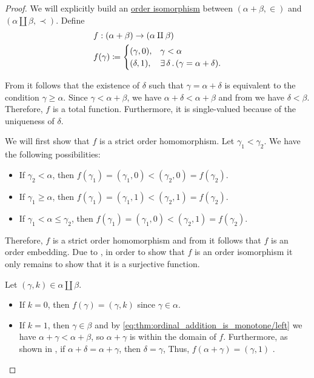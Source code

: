 \begin{proof}
  We will explicitly build an \hyperref[def:preordered_set/homomorphism]{order isomorphism} between \( (\alpha + \beta, \in) \) and \( (\alpha \amalg \beta, \prec) \). Define
  \begin{equation*}
    \begin{aligned}
      &f: (\alpha + \beta) \to (\alpha \amalg \beta) \\
      &f(\gamma) \coloneqq \begin{cases}
        (\gamma, 0), &\gamma < \alpha \\
        (\delta, 1), &\exists \thinspace \delta \thinspace . \thinspace (\gamma = \alpha + \delta).
      \end{cases}
    \end{aligned}
  \end{equation*}

  From  it follows that the existence of \( \delta \) such that \( \gamma = \alpha + \delta \) is equivalent to the condition \( \gamma \geq \alpha \). Since \( \gamma < \alpha + \beta \), we have \( \alpha + \delta < \alpha + \beta \) and from  we have \( \delta < \beta \). Therefore, \( f \) is a total function. Furthermore, it is single-valued because of the uniqueness of \( \delta \).

  We will first show that \( f \) is a strict order homomorphism. Let \( \gamma_1 < \gamma_2 \). We have the following possibilities:
  \begin{itemize}
    \item If \( \gamma_2 < \alpha \), then \( f(\gamma_1) = (\gamma_1, 0) < (\gamma_2, 0) = f(\gamma_2) \).
    \item If \( \gamma_1 \geq \alpha \), then \( f(\gamma_1) = (\gamma_1, 1) < (\gamma_2, 1) = f(\gamma_2) \).
    \item If \( \gamma_1 < \alpha \leq \gamma_2 \), then \( f(\gamma_1) = (\gamma_1, 0) < (\gamma_2, 1) = f(\gamma_2) \).
  \end{itemize}

  Therefore, \( f \) is a strict order homomorphism and from  it follows that \( f \) is an order embedding. Due to , in order to show that \( f \) is an order isomorphism it only remains to show that it is a surjective function.

  Let \( (\gamma, k) \in \alpha \amalg \beta \).
  \begin{itemize}
    \item If \( k = 0 \), then \( f(\gamma) = (\gamma, k) \) since \( \gamma \in \alpha \).
    \item If \( k = 1 \), then \( \gamma \in \beta \) and by \eqref{eq:thm:ordinal_addition_is_monotone/left} we have \( \alpha + \gamma < \alpha + \beta \), so \( \alpha + \gamma \) is within the domain of \( f \). Furthermore, as shown in , if \( \alpha + \delta = \alpha + \gamma \), then \( \delta = \gamma \), Thus, \( f(\alpha + \gamma) = (\gamma, 1) \) .
  \end{itemize}


\end{proof}

